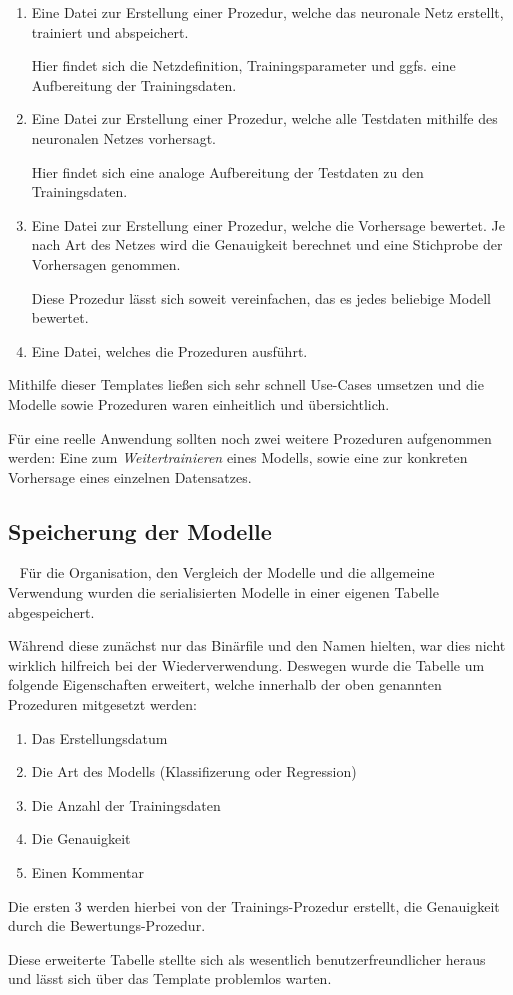 \begin{enumerate}
	\item Eine Datei zur Erstellung einer Prozedur, welche das neuronale Netz erstellt, trainiert und abspeichert.
	
	Hier findet sich die Netzdefinition, Trainingsparameter und ggfs. eine Aufbereitung der Trainingsdaten.
	\item Eine Datei zur Erstellung einer Prozedur, welche alle Testdaten mithilfe des neuronalen Netzes vorhersagt.
	
	Hier findet sich eine analoge Aufbereitung der Testdaten zu den Trainingsdaten.
	\item Eine Datei zur Erstellung einer Prozedur, welche die Vorhersage bewertet. Je nach Art des Netzes wird die Genauigkeit berechnet und eine Stichprobe der Vorhersagen genommen.
	
	Diese Prozedur lässt sich soweit vereinfachen, das es jedes beliebige Modell bewertet.
	\item Eine Datei, welches die Prozeduren ausführt.
\end{enumerate}

Mithilfe dieser Templates ließen sich sehr schnell Use-Cases umsetzen und die Modelle sowie Prozeduren waren einheitlich und übersichtlich. 

Für eine reelle Anwendung sollten noch zwei weitere Prozeduren aufgenommen werden: Eine zum \textit{Weitertrainieren} eines Modells, sowie eine zur konkreten Vorhersage eines einzelnen Datensatzes. 
\newpage
\subsection{Speicherung der Modelle} ~\newline
Für die Organisation, den Vergleich der Modelle und die allgemeine Verwendung wurden die serialisierten Modelle in einer eigenen Tabelle abgespeichert. 

Während diese zunächst nur das Binärfile und den Namen hielten, war dies nicht wirklich hilfreich bei der Wiederverwendung. Deswegen wurde die Tabelle um folgende Eigenschaften erweitert, welche innerhalb der oben genannten Prozeduren mitgesetzt werden:

\begin{enumerate}
	\item Das Erstellungsdatum
	\item Die Art des Modells (Klassifizerung oder Regression)
	\item Die Anzahl der Trainingsdaten
	\item Die Genauigkeit
	\item Einen Kommentar
\end{enumerate}

Die ersten 3 werden hierbei von der Trainings-Prozedur erstellt, die Genauigkeit durch die Bewertungs-Prozedur.

Diese erweiterte Tabelle stellte sich als wesentlich benutzerfreundlicher heraus und lässt sich über das Template problemlos warten. 